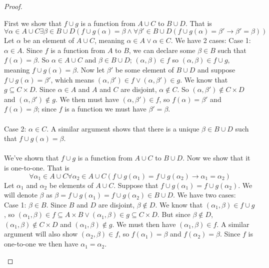 \documentclass{report}
\theoremstyle{definition}
\begin{document}
\begin{proof}
\begin{enumerate}
First we show that $f\cup g$ is a function from $A\cup C$ to $B\cup D$. That is
\begin{equation*}
\forall\alpha\in A\cup C\exists\beta\in B\cup D(f\cup g(\alpha)=\beta\land\forall\beta'\in B\cup D(f\cup g(\alpha)=\beta'\to
\beta'=\beta))
\end{equation*}
Let $\alpha$ be an element of $A\cup C$, meaning $\alpha\in A\lor\alpha\in C$. We have 2 cases:
Case 1: $\alpha\in A$. Since $f$ is a function from $A$ to $B$, we can declare some $\beta\in B$ such that $f(\alpha)=\beta$.
So $\alpha\in A\cup C$ and $\beta\in B\cup D$; $(\alpha,\beta)\in f$ so $(\alpha,\beta)\in f\cup g$, meaning $f\cup g(\alpha)=\beta$.
Now let $\beta'$ be some element of $B\cup D$ and suppose
$f\cup g(\alpha)=\beta'$, which means $(\alpha,\beta')\in f\lor(\alpha,\beta')\in g$. We know that $g\subseteq C\times D$. 
Since $\alpha\in A$ and $A$ and $C$ are disjoint, $\alpha\notin C$.
So $(\alpha,\beta')\notin C\times D$ and $(\alpha,\beta')\notin g$. We then must have $(\alpha,\beta')\in f$, so $f(\alpha)=\beta'$ 
and $f(\alpha)=\beta$; since $f$ is a function we must have $\beta'=\beta$.\\
\vspace{1mm}\\
Case 2: $\alpha\in C$. A similar argument shows that there is a unique $\beta\in B\cup D$ such that $f\cup g(\alpha)=\beta$.\\
\vspace{1mm}\\
We've shown that $f\cup g$ is a function from $A\cup C$ to $B\cup D$. Now we show that it is one-to-one. That is
\begin{equation*}
\forall\alpha_1\in A\cup C\forall\alpha_2\in A\cup C(f\cup g(\alpha_1)=f\cup g(\alpha_2)\to\alpha_1=\alpha_2)
\end{equation*}
Let $\alpha_1$ and $\alpha_2$ be elements of $A\cup C$. Suppose that
$f\cup g(\alpha_1)=f\cup g(\alpha_2)$. We will denote $\beta$ as 
$\beta=f\cup g(\alpha_1)=f\cup g(\alpha_2)\in B\cup D$. We have two cases:\\
Case 1: $\beta\in B$. Since $B$ and $D$ are disjoint, $\beta\notin D$. We know that $(\alpha_1,\beta)\in f\cup g$, so 
$(\alpha_1,\beta)\in f\subseteq A\times B\lor(\alpha_1,\beta)\in g\subseteq C\times D$. But since $\beta\notin D$, 
$(\alpha_1,\beta)\notin C\times D$ and $(\alpha_1,\beta)\notin g$. We must then have 
$(\alpha_1,\beta)\in f$. A similar argument will also show $(\alpha_2,\beta)\in f$, so $f(\alpha_1)=\beta$ and $f(\alpha_2)=\beta$.
Since $f$ is one-to-one we then have $\alpha_1=\alpha_2$.\\

\end{enumerate}
\end{proof}
\end{document}
